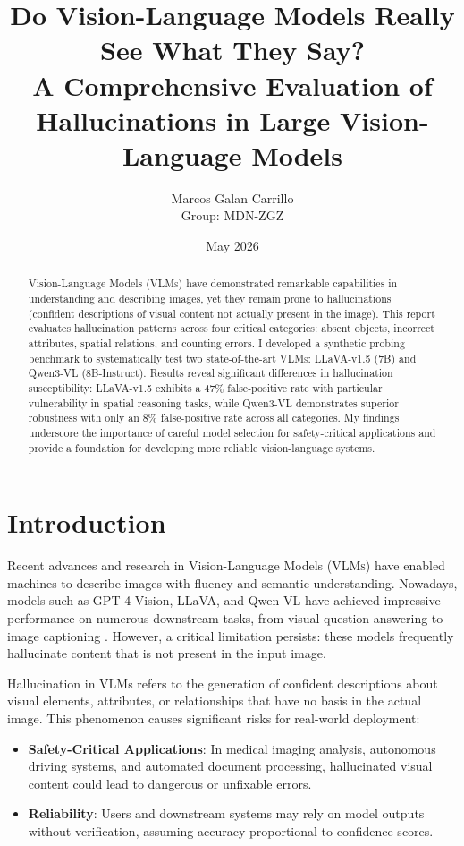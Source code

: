 \documentclass[11pt,a4paper]{article}
\title{Do Vision-Language Models Really See What They Say?\\
\large A Comprehensive Evaluation of Hallucinations in Large Vision-Language Models}
\author{Marcos Galan Carrillo \\ \small Group: MDN-ZGZ}
\date{May 2026}
\newcommand{\VLMs}{\textsc{VLMs}}
\begin{document}
\maketitle

\begin{abstract}
Vision-Language Models (\VLMs) have demonstrated remarkable capabilities in understanding and describing images, yet they remain prone to hallucinations (confident descriptions of visual content not actually present in the image). This report evaluates hallucination patterns across four critical categories: absent objects, incorrect attributes, spatial relations, and counting errors. I developed a synthetic probing benchmark to systematically test two state-of-the-art \VLMs: LLaVA-v1.5 (7B) and Qwen3-VL (8B-Instruct). Results reveal significant differences in hallucination susceptibility: LLaVA-v1.5 exhibits a 47\% false-positive rate with particular vulnerability in spatial reasoning tasks, while Qwen3-VL demonstrates superior robustness with only an 8\% false-positive rate across all categories. My findings underscore the importance of careful model selection for safety-critical applications and provide a foundation for developing more reliable vision-language systems.

\end{abstract}

\section{Introduction}

Recent advances and research in Vision-Language Models (\VLMs) have enabled machines to describe images with fluency and semantic understanding. Nowadays, models such as GPT-4 Vision, LLaVA, and Qwen-VL have achieved impressive performance on numerous downstream tasks, from visual question answering to image captioning \cite{liu2024improved,bai2025qwen3vl}. However, a critical limitation persists: these models frequently hallucinate content that is not present in the input image.

Hallucination in VLMs refers to the generation of confident descriptions about visual elements, attributes, or relationships that have no basis in the actual image. This phenomenon causes significant risks for real-world deployment:

\begin{itemize}
    \item \textbf{Safety-Critical Applications}: In medical imaging analysis, autonomous driving systems, and automated document processing, hallucinated visual content could lead to dangerous or unfixable errors.
    \item \textbf{Reliability}: Users and downstream systems may rely on model outputs without verification, assuming accuracy proportional to confidence scores.
\end{itemize}
\end{document}
